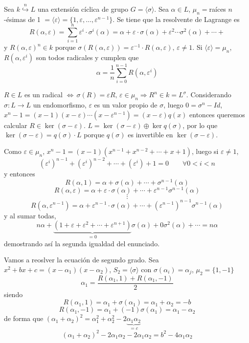 \begin{prop}
     Sea $k \overset{n}{\hookrightarrow} L$ una extensi\'on c\'iclica de grupo $G = \langle \sigma \rangle$. Sea $\alpha \in L$, $\mu_n = $ra\'ices $n$-\'esimas de 1 $=\langle \varepsilon \rangle = \{1, \varepsilon, \ldots,\varepsilon^{n-1}\}$. Se tiene que la resolvente de Lagrange es
    $$\boxed{R(\alpha, \varepsilon) = \sum_{i=1}^n \varepsilon^i \cdot \sigma^i(\alpha) = \alpha + \varepsilon \cdot \sigma(\alpha) +\varepsilon^2 \cdots \sigma^2(\alpha) + \cdots + }$$
    y $R(\alpha, \varepsilon)^n \in k$ porque $\sigma(R(\alpha, \varepsilon)) = \varepsilon^{-1} \cdot R(\alpha, \varepsilon) ,\, \varepsilon \neq 1$. Si $\langle \varepsilon \rangle = \mu_n$, $R(\alpha, \varepsilon^i)$ son todos radicales y cumplen que 
    $$\boxed{\alpha = \frac{1}{n}\sum_{i=0}^{n-1} R(\alpha, \varepsilon^i)}$$
\end{prop}
\begin{dem}
    $R\in L$ es un radical $\iff \, \sigma(R) = \varepsilon R, \, \varepsilon \in \mu_n \Rightarrow R^n \in k = L^{\sigma}$. Considerando $\sigma: L \longrightarrow L$ un endomorfismo, $\varepsilon$ es un valor propio de $\sigma$, luego $0 = \sigma^n - Id$, $x^n-1 = (x-1)(x-\varepsilon) \cdots (x-\varepsilon^{n-1}) = (x-\varepsilon)q(x)$ entonces queremos calcular $R \in \ker(\sigma -\varepsilon)$. $L = \ker(\sigma - \varepsilon) \oplus \ker q(\sigma)$, por lo que $\ker(\sigma-\varepsilon) = q(\sigma) \cdot L$ porque $q(\sigma)$ es invertible en $\ker(\sigma-\varepsilon)$. 

    Como $\varepsilon \in \mu_n$, $x^n-1 = (x-1)(x^{n-1} + x^{n-2} + \cdots + x+ 1)$, luego si $\varepsilon \neq 1$, 
    $$(\varepsilon^i)^{n-1} + (\varepsilon^i)^{n-2} + \cdots +(\varepsilon^i)+1=0 \qquad \forall 0< i < n$$
    y entonces 
    $$R(\alpha, 1) = \alpha + \sigma(\alpha) + \cdots + \sigma^{n-1} (\alpha)$$
$$R(\alpha, \varepsilon) = \alpha + \varepsilon \cdot \sigma(\alpha) + \cdots +\varepsilon^{n-1} \sigma^{n-1} (\alpha)$$
$$\vdots$$
$$R(\alpha, \varepsilon^{n-1}) = \alpha + \varepsilon^{n-1} \cdot \sigma(\alpha) + \cdots +(\varepsilon^{n-1})^{n-1} \sigma^{n-1} (\alpha)$$
y al sumar todas, 
$$n \alpha+ \underbrace{(1+\varepsilon + \varepsilon^2 + \cdots + \varepsilon^{n+1})}_{=0} \sigma(\alpha) + 0 \sigma^2(\alpha) +  \cdots  = n \alpha$$ 
demostrando as\'i la segunda igualdad del enunciado.
\end{dem}
\begin{ejem}
    Vamos a reoslver la ecuaci\'on de segundo grado. Sea $x^2+bx+c = (x-\alpha_1)(x-\alpha_2)$, $S_2 = \langle \sigma \rangle$ con $\sigma(\alpha_i) = \alpha_j$, $\mu_2 = \{1,-1\}$
    $$\alpha_1 = \frac{R(\alpha_1,1) + R(\alpha_1,-1)}{2}$$
    siendo $$R(\alpha_1,1) = \alpha_1 +  \sigma(\alpha_1) = \alpha_1 +  \alpha_2 = -b$$
    $$R(\alpha_1,-1) =  \alpha_1 + (-1)\sigma( \alpha_1 ) =  \alpha_1 -  \alpha_2 $$
    de forma que $( \alpha_1 +  \alpha_2)^2 =  \alpha_1^2 +  \alpha_2^2 -2 \underbrace{\alpha_1 \alpha_2 }_{=c} $
    $$( \alpha_1 + \alpha_2)^2 - 2 \alpha_1  \alpha_2 - 2  \alpha_1  \alpha_2 = b^2 - 4  \alpha_1  \alpha_2 $$
\end{ejem}
